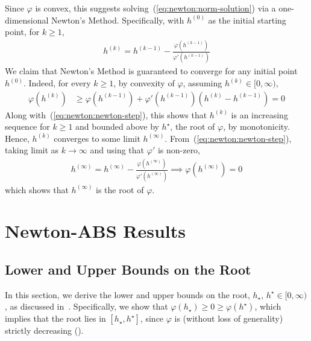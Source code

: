 Since $\varphi$ is convex, this suggests solving~(\ref{eq:newton:norm-solution})
via a one-dimensional Newton's Method.
Specifically, with $h^{(0)}$ as the initial starting point, for $k\geq 1$,
\begin{align}
    h^{(k)} = h^{(k-1)} - \frac{\varphi(h^{(k-1)})}{\varphi'(h^{(k-1)})}
    \label{eq:newton:newton-step}
\end{align}
We claim that Newton's Method is guaranteed to converge for any initial point $h^{(0)}$.
Indeed, for every $k\geq 1$, by convexity of $\varphi$,
assuming $h^{(k)} \in [0,\infty)$,
\begin{align*}
    \varphi(h^{(k)})
    &\geq
    \varphi(h^{(k-1)})
    + \varphi'(h^{(k-1)}) (h^{(k)} - h^{(k-1)})
    =
    0
\end{align*}
Along with~(\ref{eq:newton:newton-step}),
this shows that $h^{(k)}$ is an increasing sequence for $k\geq 1$ 
and bounded above by $h^\star$, the root of $\varphi$, by monotonicity.
Hence, $h^{(k)}$ converges to some limit $h^{(\infty)}$. 
From~(\ref{eq:newton:newton-step}), taking limit as $k\to \infty$ and using that $\varphi'$ is non-zero,
\begin{align*}
    h^{(\infty)} = h^{(\infty)} - \frac{\varphi(h^{(\infty)})}{\varphi'(h^{(\infty)})}
    \implies
    \varphi(h^{(\infty)}) = 0
\end{align*}
which shows that $h^{(\infty)}$ is the root of $\varphi$.

\section{Newton-ABS Results}\label{appendix:newton-abs}

\subsection{Lower and Upper Bounds on the Root}\label{appendix:newton-abs:bounds}

In this section, we derive the lower and upper bounds on the root, $h_\star$, $h^\star \in [0,\infty)$,
as discussed in~.
Specifically, we show that $\varphi(h_\star) \geq 0 \geq \varphi(h^\star)$,
which implies that the root lies in $[h_\star, h^\star]$,
since $\varphi$ is 
(without loss of generality)
strictly decreasing ().

